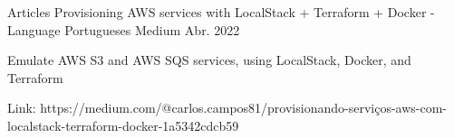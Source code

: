 

\begin{cventries}

  \cventry
    {Articles} %
    {Provisioning AWS services with LocalStack + Terraform + Docker - Language Portugueses} %
    {Medium} %
    {Abr. 2022} %
    {
      \begin{cvitems} %
        \item {Emulate AWS S3 and AWS SQS services, using LocalStack, Docker, and Terraform}
        \item {Link: https://medium.com/@carlos.campos81/provisionando-serviços-aws-com-localstack-terraform-docker-1a5342cdcb59}
      \end{cvitems}
    }


\end{cventries}
